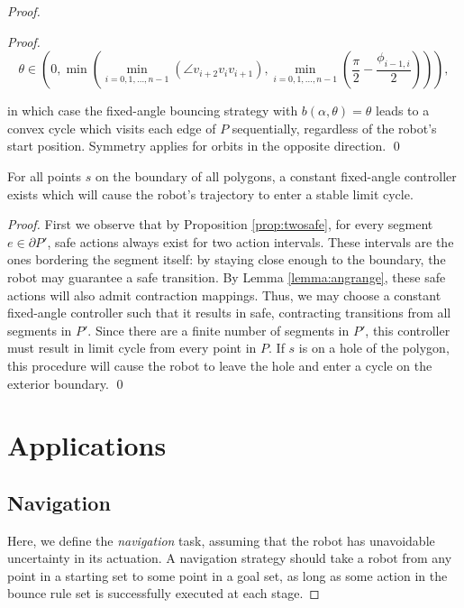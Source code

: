 \documentclass[]{styles/svproc}  %
\begin{document}
\begin{proof}
\begin{proof}
\begin{equation*}
\theta \in (0, \min(\min_{i = 0, 1, \dots, n-1}(\angle v_{i+2}v_{i}v_{i+1}),
\min_{i = 0, 1, \dots, n-1}(\frac{\pi}{2}-\frac{\phi_{i-1, i}}{2}))),
\end{equation*}

\noindent
in which case the fixed-angle bouncing strategy with $b(\alpha, \theta) = \theta$ leads to a convex
cycle which visits each edge of $P$ sequentially, regardless of the robot's start position.
Symmetry applies for orbits in the opposite direction.
\qed

\end{proof}

\begin{proposition} \label{prop:cycle}
For all points $s$ on the boundary of all polygons, a constant
fixed-angle controller exists which will cause the robot's trajectory to enter a
stable limit cycle.
\end{proposition}

\begin{proof}
First we observe that by Proposition \ref{prop:twosafe}, for every segment $e
\in \partial P'$, 
safe actions always exist
for two action intervals. These intervals are the ones bordering the segment itself:
by staying close enough to the boundary, the robot may guarantee a safe
transition. By Lemma \ref{lemma:angrange}, these safe actions will also
admit contraction mappings. Thus, we may choose a constant fixed-angle
controller such that it results in safe, contracting transitions from all
segments in $P'$. Since there are a finite number of segments in $P'$, this
controller must result in limit cycle from every point in $P$. If $s$ is on a
hole of the polygon, this procedure will cause the robot to leave the hole and
enter a cycle on the exterior boundary. \qed
\end{proof}

\section{Applications}

\subsection{Navigation}

Here, we define the \emph{navigation} task, assuming that
the robot has unavoidable uncertainty in its actuation. 
A navigation strategy should take a robot
from any point in a starting set to some point in a goal set, as long as some
action in the bounce rule set is successfully executed at each stage. 


\end{proof}
\end{document}
